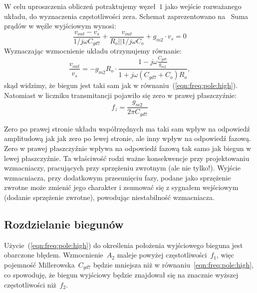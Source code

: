 \documentclass[twoside,pl,final]{labman}
\begin{document}
W celu uproszczenia obliczeń potraktujemy węzeł~$1$
jako wejście rozważanego układu, do wyznaczenia częstotliwości zera.
Schemat zaprezentowano na~
Suma prądów w węźle wyjściowym wynosi:
\begin{equation}
  \frac{v_{out} - v_s}{1 / j \omega C_{gd7}} +
  \frac{v_{out}}{R_o || 1 / j \omega C_o} +
  g_{m2} \cdot v_s = 0
\end{equation}
Wyznaczając wzmocnienie układu otrzymujemy równanie:
\begin{equation}
  \frac{v_{out}}{v_{s}} = -g_{m2} R_o \cdot
                          \frac{1 - j \omega \frac{C_{gd7}}{g_{m2}}}
                               {1 + j \omega ( C_{gd7} + C_o ) R_o},
  \label{eqn:freq:rhp:tf}
\end{equation}
skąd widzimy, że biegun jest taki sam jak w
równaniu~(\ref{eqn:freq:pole:high}).
Natomiast w liczniku transmitancji pojawiło się zero w prawej płaszczyźnie:
\begin{equation}
  f_z = \frac{g_{m2}}{2 \pi C_{gd7}}
  \label{eqn:freq:zero}
\end{equation}

Zero po prawej stronie układu współrzędnych
ma taki sam wpływ na odpowiedź amplitudową jak jak zero po lewej stronie,
ale inny wpływ na odpowiedź fazową.
Zero w prawej płaszczyźnie wpływa na odpowiedź fazową
tak samo jak biegun w lewej płaszczyźnie.
Ta właściwość rodzi ważne konsekwencje przy projektowaniu wzmacniaczy,
pracujących przy sprzężeniu zwrotnym (ale nie tylko!).
Wyjście wzmacniacza, przy dodatkowym przesunięciu fazy,
podane jako sprzężenie zwrotne może zmienić jego charakter
i zsumować się z sygnałem wejściowym
(dodanie sprzężenie zwrotne), powodując niestabilność wzmacniacza.

\subsection{Rozdzielanie biegunów}
\label{freq:split}

Użycie~(\ref{eqn:freq:pole:high}) do określenia położenia
wyjściowego bieguna jest obarczone błędem.
Wzmocnienie~$A_2$ maleje powyżej częstotliwości~$f_1$,
więc pojemność Millerowska~$C_{gd7}$ będzie mniejsza
niż w równaniu~\ref{eqn:freq:pole:high},
co spowoduję, że biegun wyjściowy będzie znajdował się
na znacznie wyższej częstotliwości niż~$f_2$.
\end{document}
